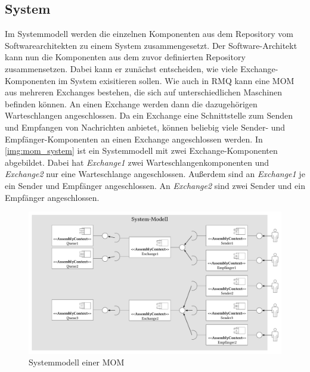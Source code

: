 \subsection{System}
Im Systemmodell werden die einzelnen Komponenten aus dem Repository vom Softwarearchitekten zu einem System zusammengesetzt. Der Software-Architekt kann nun die Komponenten aus dem zuvor definierten Repository zusammensetzen. Dabei kann er zunächst entscheiden, wie viele Exchange-Komponenten im System exisitieren sollen. Wie auch in RMQ kann eine MOM aus mehreren Exchanges bestehen, die sich auf unterschiedlichen Maschinen befinden können. An einen Exchange werden dann die dazugehörigen Warteschlangen angeschlossen. Da ein Exchange eine Schnittstelle zum Senden und Empfangen von Nachrichten anbietet, können beliebig viele Sender- und Empfänger-Komponenten an einen Exchange angeschlossen werden. In \autoref{img:mom_system} ist ein Systemmodell mit zwei Exchange-Komponenten abgebildet. Dabei hat \emph{Exchange1} zwei Warteschlangenkomponenten und \emph{Exchange2} nur eine Warteschlange angeschlossen. Außerdem sind an \emph{Exchange1} je ein Sender und Empfänger angeschlossen. An \emph{Exchange2} sind zwei Sender und ein Empfänger angeschlossen. 

\begin{figure}
\center
  \includegraphics[width=1\textwidth]{images/modelling/modelingSystem.pdf}
  \caption{Systemmodell einer MOM}
  \label{img:mom_system}
\end{figure}
